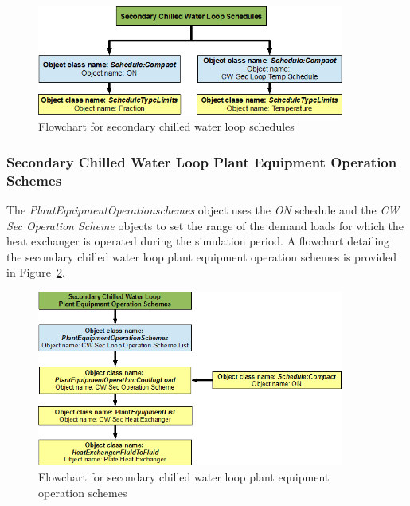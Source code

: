 \begin{figure}[hbtp] %
\centering
\includegraphics[width=0.9\textwidth, height=0.9\textheight, keepaspectratio=true]{media/image112.png}
\caption{Flowchart for secondary chilled water loop schedules \protect \label{fig:flowchart-for-secondary-chilled-water-loop-schedules}}
\end{figure}

\subsubsection{Secondary Chilled Water Loop Plant Equipment Operation Schemes}\label{secondary-chilled-water-loop-plant-equipment-operation-schemes}

The \emph{PlantEquipmentOperationschemes} object uses the \emph{ON} schedule and the \emph{CW Sec Operation Scheme} objects to set the range of the demand loads for which the heat exchanger is operated during the simulation period. A flowchart detailing the secondary chilled water loop plant equipment operation schemes is provided in Figure~\ref{fig:flowchart-for-secondary-chilled-water-loop-plant-equipment-operation}.

\begin{figure}[hbtp] %
\centering
\includegraphics[width=0.9\textwidth, height=0.9\textheight, keepaspectratio=true]{media/image113.png}
\caption{Flowchart for secondary chilled water loop plant equipment operation schemes \protect \label{fig:flowchart-for-secondary-chilled-water-loop-plant-equipment-operation}}
\end{figure}

